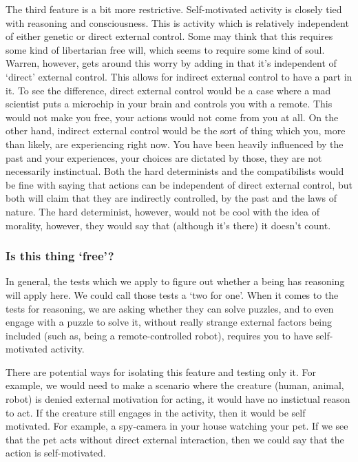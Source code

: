 The third feature is a bit more restrictive. Self-motivated activity is closely tied with reasoning and consciousness. This is activity which is relatively independent of either genetic or direct external control. Some may think that this requires some kind of libertarian free will, which seems to require some kind of soul. Warren, however, gets around this worry by adding in that it's independent of `direct' external control. This allows for indirect external control to have a part in it. To see the difference, direct external control would be a case where a mad scientist puts a microchip in your brain and controls you with a remote. This would not make you free, your actions would not come from you at all. On the other hand, indirect external control would be the sort of thing which you, more than likely, are experiencing right now. You have been heavily influenced by the past and your experiences, your choices are dictated by those, they are not necessarily instinctual. Both the hard determinists and the compatibilists would be fine with saying that actions can be independent of direct external control, but both will claim that they are indirectly controlled, by the past and the laws of nature. The hard determinist, however, would not be cool with the idea of morality, however, they would say that (although it's there) it doesn't count.

\subsubsection{Is this thing `free'?}

In general, the tests which we apply to figure out whether a being has reasoning will apply here. We could call those tests a `two for one'. When it comes to the tests for reasoning, we are asking whether they can solve puzzles, and to even engage with a puzzle to solve it, without really strange external factors being included (such as, being a remote-controlled robot), requires you to have self-motivated activity.

There are potential ways for isolating this feature and testing only it. For example, we would need to make a scenario where the creature (human, animal, robot) is denied external motivation for acting, it would have no instictual reason to act. If the creature still engages in the activity, then it would be self motivated. For example, a spy-camera in your house watching your pet. If we see that the pet acts without direct external interaction, then we could say that the action is self-motivated. 


